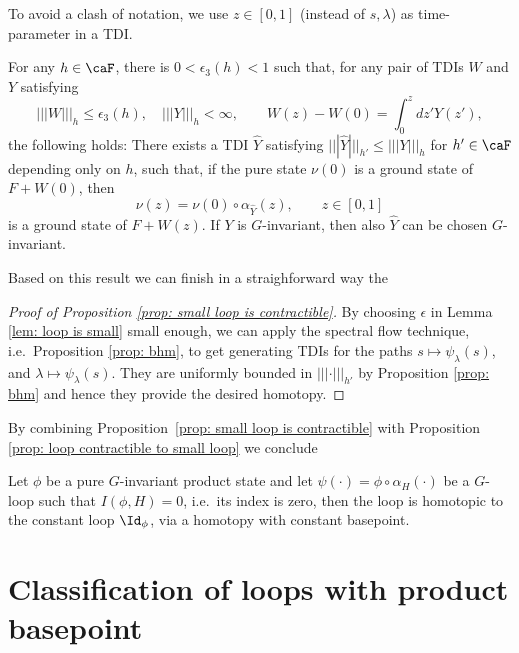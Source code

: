 To avoid a clash of notation, we use $z \in[0,1]$ (instead of $s,\lambda$) as time-parameter in a TDI.
\begin{proposition}\label{prop: bhm}
	For any $h\in\caF$, there is $0<\epsilon_3(h)< 1$ such that, for any pair of TDIs $W$ and $Y$ satisfying
	\begin{equation}\label{eq: w and e}
		|||W|||_h\leq \epsilon_3(h), \quad   |||Y|||_h <\infty, \qquad   W(z)-W(0)=\int^{z}_{0} d z' Y(z'),
	\end{equation}
	the following holds: There exists a TDI $\hat{Y}$ satisfying $|||\hat Y|||_{h'} \leq ||| Y|||_{h} $ for  $h' \in \caF$ depending only on $h$, such that, if the pure state $\nu(0)$ is a ground state of $F+W(0)$, then 
	\begin{equation}\label{eq: states determined}
		\nu(z)=\nu(0)\circ\alpha_{\hat Y}(z),\qquad z \in [0,1] 
	\end{equation}
	is a ground state of $F+W(z)$. If $Y$ is $G$-invariant, then also $\hat{Y}$ can be chosen $G$-invariant.
\end{proposition}
Based on this result we can finish in a straighforward way the
\begin{proof}[Proof of Proposition \ref{prop: small loop is contractible}]
	By choosing $\epsilon$ in Lemma \ref{lem: loop is small} small enough, we can apply the spectral flow technique, i.e.\ Proposition \ref{prop: bhm}, to get generating TDIs for the paths $s\mapsto \psi_\lambda(s)$, and  $\lambda
	\mapsto \psi_\lambda(s)$. They are uniformly bounded in $|||\cdot|||_{h'}$ by Proposition \ref{prop: bhm} and hence they provide the desired homotopy. 
\end{proof}

By combining Proposition~\ref{prop: small loop is contractible} with Proposition \ref{prop: loop contractible to small loop} we conclude 
\begin{theorem}\label{thm: contractibility products}
	Let $\phi$ be a pure $G$-invariant product state and let $\psi(\cdot)=\phi\circ\alpha_{H}(\cdot)$ be a $G$-loop such that $I(\phi,H)=0$, i.e.\ its index is zero, then the loop is homotopic to the constant loop $\Id_\phi$, via a homotopy with constant basepoint. 
\end{theorem}


\section{Classification of loops with product basepoint} \label{sec: classification for product loops}


